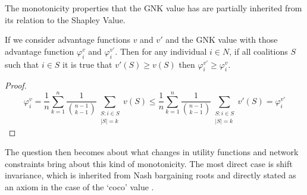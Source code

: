 The monotonicity properties that the GNK value has are partially inherited from its relation to the Shapley Value.

\begin{theorem}\label{thm:monotonicity}
If we consider advantage functions $v$ and $v'$ and the GNK value with those advantage function $\varphi^v_i$ and $\varphi^{v'}_i$.
Then for any individual $i\in N$, if all coalitions $S$ such that $i\in S$ it is true that $v'(S)\ge v(S)$ then $\varphi^{v'}_i \ge \varphi^v_i$.
\end{theorem}
\begin{proof}
$$\varphi^v_i = \frac{1}{n}\sum_{k=1}^n \frac{1}{\binom{n-1}{k-1}} \sum_{\substack{S:i\in S \\ |S|=k}}v(S) \le \frac{1}{n}\sum_{k=1}^n \frac{1}{\binom{n-1}{k-1}} \sum_{\substack{S:i\in S \\ |S|=k}}v'(S) =\varphi^{v'}_i$$
\end{proof}

The question then becomes about what changes in utility functions and network constraints bring about this kind of monotonicity. The most direct case is shift invariance, which is inherited from Nash bargaining roots \cite{nash2} and directly stated as an axiom in the case of the `coco' value \cite{kalai1}.

